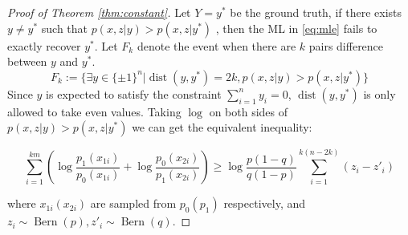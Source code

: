 \documentclass[conference]{IEEEtran}
\DeclareMathOperator{\dist}{dist}
\DeclareMathOperator{\Bern}{Bern}
\begin{document}
\begin{proof}[Proof of Theorem \ref{thm:constant}]
Let $Y=y^*$ be the ground truth, if there exists $y\neq y^*$ such that $p(x,z|y) > p(x,z|y^*)$	,
then the ML in \eqref{eq:mle} fails to exactly recover $y^*$. Let $F_k$ denote
the event when there are $k$ pairs difference between $y$ and $y^*$.
\begin{equation}\label{eq:Fk}
F_k:=\{\exists y \in \{\pm 1\}^n | \dist(y, y^*)=2k, p(x,z|y) > p(x,z|y^*) \}
\end{equation}
Since
$y$ is expected to satisfy the constraint $\sum_{i=1}^n y_i=0$, $\dist(y, y^*)$ is only allowed to take even
values. Taking $\log$ on both sides of $p(x,z|y) > p(x,z|y^*)$ we can get the equivalent inequality:

\begin{equation}\label{eq:ein}
\sum_{i=1}^{km} (\log \frac{p_1(x_{1i})}{p_0(x_{1i})}
+ \log \frac{p_0(x_{2i})}{p_1(x_{2i})})
\geq \log \frac{p(1-q)}{q(1-p)} \sum_{i=1}^{k(n-2k)}(z_{i} - z'_{i})
\end{equation}

where $x_{1i}(x_{2i})$ are sampled from $p_0(p_1)$ respectively,
and $z_{i} \sim \Bern(p), z'_{i} \sim \Bern(q)$.


\end{proof}
\end{document}
